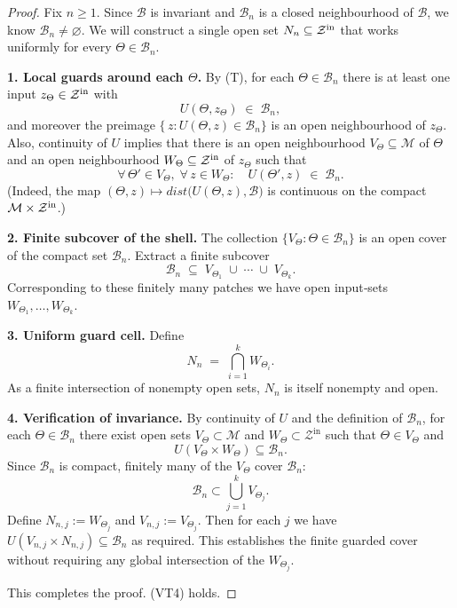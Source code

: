 \documentclass[12pt]{article}
\theoremstyle{definition}
\theoremstyle{plain}
\begin{document}
\begin{proof}
Fix \(n\ge1\).  Since \(\mathcal B\) is invariant and \(\mathcal B_n\) is a closed neighbourhood of \(\mathcal B\), we know
\(\mathcal B_n\neq\varnothing\).  We will construct a single open set \(N_n\subseteq\mathcal Z^{\rm in}\) that works uniformly for every \(\Theta\in\mathcal B_n\).

\medskip\noindent
\textbf{1. Local guards around each \(\Theta\).}  
By (T), for each \(\Theta\in\mathcal B_n\) there is at least one input \(z_\Theta\in\mathcal Z^{\rm in}\) with
\[
  U(\Theta,z_\Theta)\;\in\;\mathcal B_n,
\]
and moreover the preimage
\(\{\,z:U(\Theta,z)\in\mathcal B_n\}\)
is an open neighbourhood of \(z_\Theta\).  Also, continuity of \(U\) implies that there is an open neighbourhood \(V_\Theta\subseteq\mathcal M\) of \(\Theta\) and an open neighbourhood \(W_\Theta\subseteq\mathcal Z^{\rm in}\) of \(z_\Theta\) such that
\[
  \forall\,\Theta'\in V_\Theta,\;
  \forall\,z\in W_\Theta:
  \quad U(\Theta',z)\;\in\;\mathcal B_n.
\]
(Indeed, the map \((\Theta,z)\mapsto dist\bigl(U(\Theta,z),\mathcal B\bigr)\)
is continuous on the compact \(\mathcal M\times\mathcal Z^{\rm in}\).)

\medskip\noindent
\textbf{2. Finite subcover of the shell.}  
The collection \(\{V_\Theta:\Theta\in\mathcal B_n\}\) is an open cover of the compact set \(\mathcal B_n\).  Extract a finite subcover
\[
  \mathcal B_n \;\subseteq\; V_{\Theta_1}\;\cup\;\cdots\;\cup\;V_{\Theta_k}.
\]
Corresponding to these finitely many patches we have open input‐sets \(W_{\Theta_1},\dots,W_{\Theta_k}\).

\medskip\noindent
\textbf{3. Uniform guard cell.}  
Define
\[
  N_n \;=\;\bigcap_{i=1}^k W_{\Theta_i}.
\]
As a finite intersection of nonempty open sets, \(N_n\) is itself nonempty and open.  

\medskip\noindent
\textbf{4. Verification of invariance.}  
By continuity of $U$ and the definition of $\mathcal B_n$, for each $\Theta\in\mathcal B_n$
there exist open sets $V_\Theta\subset\mathcal M$ and $W_\Theta\subset\mathcal Z^{\mathrm{in}}$
such that $\Theta\in V_\Theta$ and
\[
U(V_\Theta\times W_\Theta) \subseteq \mathcal B_n .
\]
Since $\mathcal B_n$ is compact, finitely many of the $V_\Theta$ cover $\mathcal B_n$:
\[
\mathcal B_n \subset \bigcup_{j=1}^k V_{\Theta_j}.
\]
Define $N_{n,j} := W_{\Theta_j}$ and $V_{n,j} := V_{\Theta_j}$. Then for each $j$ we have
$U(V_{n,j} \times N_{n,j}) \subseteq \mathcal B_n$ as required.
This establishes the finite guarded cover without requiring any global intersection of the $W_{\Theta_j}$.

This completes the proof. (VT4) holds.
\end{proof}
\end{document}
